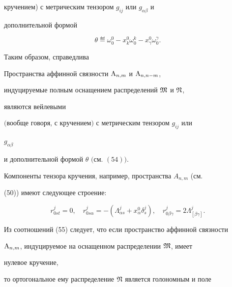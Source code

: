 кручением) с метрическим тензором $g_{ij}$ или $g_{\alpha\beta}$ и 


дополнительной формой 


\begin{equation} 


\theta\eqdef\omega^0_0-x^0_k\omega^k_0- 


x^0_\gamma\omega^\gamma_0. 


\end{equation} 


 


Таким образом, справедлива 


 


\begin{thm} 


Пространства аффинной связности $\mathrm{A}_{n,m}$ и $\mathrm{A}_{n,n-m}$, 


индуцируемые полным оснащением распределений $\frak M$ и $\frak N$, 


являются вейлевыми 


$($вообще говоря, с кручением$)$ с метрическим тензором $g_{ij}$ или 


$g_{\alpha\beta}$ 


и дополнительной формой $\theta$ $($см. $(54))$. 


\end{thm} 


 


Компоненты тензора кручения, например, пространства $A_{n,m}$ (см. 


(50)) имеют следующее строение: 


\begin{equation} 


r^j_{0s t}=0,\quad r^j_{0s\alpha}= 


-(\Lambda^j_{\alpha s}+x^0_\alpha\delta^j_s),\quad 


r^j_{0\beta\gamma}=2\Lambda^j_{[\beta\gamma]}. 


\end{equation} 


Из соотношений (55) следует, что если пространство аффинной связности 


$\mathrm{A}_{n,m}$, индуцируемое на оснащенном распределении $\frak M$, имеет 


нулевое кручение, 


то ортогональное ему распределение $\frak N$ является голономным и поле 


